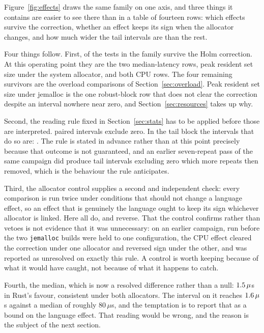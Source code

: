 \documentclass[english,twoside,openright,a4paper,censored,csm,software-track-2020]{HYthesisML}
\begin{document}
Figure~\ref{fig:effects} draws the same family on one axis, and three things it contains are
easier to see there than in a table of fourteen rows: which effects survive the correction,
whether an effect keeps its sign when the allocator changes, and how much wider the tail
intervals are than the rest.

Four things follow. First, \NSignificant{} of the \NTests{} tests in the family survive the Holm
correction. At this operating point they are the two median-latency rows, peak resident set size
under the system allocator, and both CPU rows. The four remaining survivors are the overload
comparisons of Section~\ref{sec:overload}. Peak resident set size under jemalloc is the one
robust-block row that does not clear the correction despite an interval nowhere near zero, and
Section~\ref{sec:resources} takes up why.

Second, the reading rule fixed in Section~\ref{sec:stats} has to be applied before those are
interpreted. \NExclZero{} paired intervals exclude zero. In the tail block the intervals that do
so are: \TailExclZeroRows. The rule is stated in advance rather than at this point precisely
because that outcome is not guaranteed, and an earlier seven-repeat pass of the same campaign did
produce tail intervals excluding zero which more repeats then removed, which is the behaviour the
rule anticipates.

Third, the allocator control supplies a second and independent check: every comparison is run
twice under conditions that should not change a language effect, so an effect that is genuinely
the language ought to keep its sign whichever allocator is linked. Here
\CrossAllocConsistent{} all do, and \NCrossAllocReversed{} reverse. That the control confirms
rather than vetoes is not evidence that it was unnecessary: on an earlier campaign, run before the
two \texttt{jemalloc} builds were held to one configuration, the CPU effect cleared the correction
under one allocator and reversed sign under the other, and was reported as unresolved on exactly
this rule. A control is worth keeping because of what it would have caught, not because of what
it happens to catch.

Fourth, the median, which is now a resolved difference rather than a null: $1.5\,\mu$s
in Rust's favour, consistent under both allocators. The interval on it reaches
$1.6\,\mu$s against a median of roughly $80\,\mu$s, and the temptation is to report
that as a bound on the language effect. That reading would be wrong, and the reason is the
subject of the next section.
\end{document}
